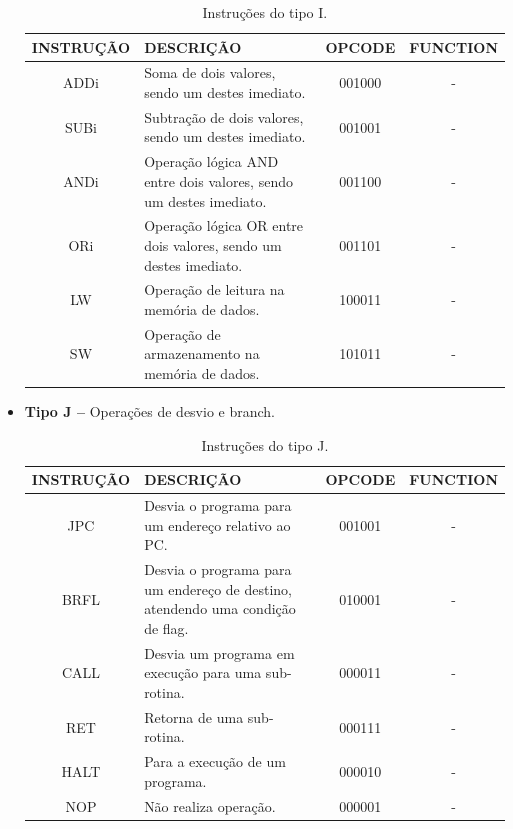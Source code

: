 \documentclass{report}
\begin{document}
\begin{itemize}
	\begin{table}[H]
	\centering
	\begin{tabular}{|c|m{6cm}|c|c|}
  	\hline 
  	\textbf{INSTRUÇÃO} & \textbf{DESCRIÇÃO} & \textbf{OPCODE} & \textbf{FUNCTION} \\ 
  	\hline 
  	ADDi &  Soma de dois valores, sendo um destes imediato. & 001000 & - \\ \hline
  	SUBi & Subtração de dois valores, sendo um destes imediato. & 001001 & - \\ \hline
  	ANDi & Operação lógica AND entre dois valores, sendo um destes imediato. & 001100 & - \\ \hline
  	ORi & Operação lógica OR entre dois valores, sendo um destes imediato. & 001101 & - \\ \hline
    LW & Operação de leitura na memória de dados. & 100011 & - \\ \hline
    SW & Operação de armazenamento na memória de dados. & 101011 & - \\ \hline
  	\end{tabular} 
  	\caption{Instruções do tipo I.}
  \end{table}
    
    \item \textbf{Tipo J --} Operações de desvio e branch.
    
	\begin{table}[H]
	\centering
	\begin{tabular}{|c|m{6cm}|c|c|}
  	\hline 
  	\textbf{INSTRUÇÃO} & \textbf{DESCRIÇÃO} & \textbf{OPCODE} & \textbf{FUNCTION} \\ 
  	\hline 

  	JPC & Desvia o programa para um endereço relativo ao PC. & 001001 & - \\ \hline
  	BRFL & Desvia o programa para um endereço de destino, atendendo uma condição de flag. & 010001 & - \\ \hline
  	CALL & Desvia um programa em execução para uma sub-rotina. & 000011 & - \\ \hline
  	RET & Retorna de uma sub-rotina. & 000111 & - \\ \hline
  	HALT & Para a execução de um programa. & 000010 & - \\ \hline
  	NOP & Não realiza operação. & 000001 & - \\ \hline

  	\end{tabular} 
  	\caption{Instruções do tipo J.}
  \end{table}
    
    \end{itemize}
\end{document}
